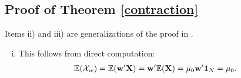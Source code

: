 \documentclass[12pt]{article}
\newcommand{\E}{\mathbb{E}}
\theoremstyle{definition}
\theoremstyle{definition}
\def\one{{\bf 1}}
\def\w{{\bf w}}
\def\X{{\bf X}}
\def\E{{\mathbb E}}
\begin{document}
\subsection{Proof of Theorem \ref{contraction}}
Items ii) and iii) are generalizations of the proof in \cite{Ranjan08}. 
\begin{enumerate}[i)]
\item
This follows from direct computation:
\begin{align*}
\E(\mathcal{X}_w) = \E(\w' \X) &= \w' \E(\X) = \mu_0 \w' \one_N = \mu_0.
\end{align*}


\end{enumerate}
\end{document}

